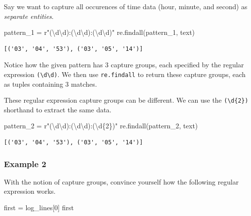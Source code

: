 \documentclass[
  letterpaper,
  DIV=11,
  numbers=noendperiod]{scrreprt}
\newenvironment{Shaded}{\begin{snugshade}}{\end{snugshade}}
\newcommand{\DecValTok}[1]{\textcolor[rgb]{0.68,0.00,0.00}{#1}}
\newcommand{\NormalTok}[1]{\textcolor[rgb]{0.00,0.23,0.31}{#1}}
\newcommand{\OperatorTok}[1]{\textcolor[rgb]{0.37,0.37,0.37}{#1}}
\newcommand{\SpecialCharTok}[1]{\textcolor[rgb]{0.37,0.37,0.37}{#1}}
\newcommand{\VerbatimStringTok}[1]{\textcolor[rgb]{0.13,0.47,0.30}{#1}}
\begin{document}
Say we want to capture all occurences of time data (hour, minute, and
second) as \emph{separate entities}.

\begin{Shaded}
\begin{Highlighting}[]
\NormalTok{pattern\_1 }\OperatorTok{=} \VerbatimStringTok{r"(\textbackslash{}d\textbackslash{}d):(\textbackslash{}d\textbackslash{}d):(\textbackslash{}d\textbackslash{}d)"}
\NormalTok{re.findall(pattern\_1, text)}
\end{Highlighting}
\end{Shaded}

\begin{verbatim}
[('03', '04', '53'), ('03', '05', '14')]
\end{verbatim}

Notice how the given pattern has 3 capture groups, each specified by the
regular expression \texttt{(\textbackslash{}d\textbackslash{}d)}. We
then use \texttt{re.findall} to return these capture groups, each as
tuples containing 3 matches.

These regular expression capture groups can be different. We can use the
\texttt{(\textbackslash{}d\{2\})} shorthand to extract the same data.

\begin{Shaded}
\begin{Highlighting}[]
\NormalTok{pattern\_2 }\OperatorTok{=} \VerbatimStringTok{r"(\textbackslash{}d\textbackslash{}d):(\textbackslash{}d\textbackslash{}d):(\textbackslash{}d}\SpecialCharTok{\{2\}}\VerbatimStringTok{)"}
\NormalTok{re.findall(pattern\_2, text)}
\end{Highlighting}
\end{Shaded}

\begin{verbatim}
[('03', '04', '53'), ('03', '05', '14')]
\end{verbatim}

\subsubsection{Example 2}\label{example-2}

With the notion of capture groups, convince yourself how the following
regular expression works.

\begin{Shaded}
\begin{Highlighting}[]
\NormalTok{first }\OperatorTok{=}\NormalTok{ log\_lines[}\DecValTok{0}\NormalTok{]}
\NormalTok{first}
\end{Highlighting}
\end{Shaded}
\end{document}
